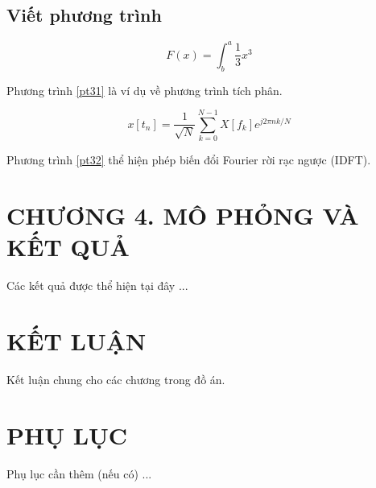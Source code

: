 \documentclass{thesis}
\begin{document}
\subsection{Viết phương trình}
    \begin{equation}\label{pt31}
        F(x) = \int^a_b \frac{1}{3}x^3
    \end{equation}
    
Phương trình \ref{pt31} là ví dụ về phương trình tích phân.

    \begin{equation}\label{pt32}
         x[t_n] = \frac{1}{\sqrt{N}} \sum_{k=0}^{N-1}X[f_k]e^{j 2\pi n k/N}
    \end{equation}
    
Phương trình \ref{pt32} thể hiện phép biến đổi Fourier rời rạc ngược (IDFT).

\newpage
\section*{CHƯƠNG 4. MÔ PHỎNG VÀ KẾT QUẢ}
\setcounter{section}{4}
    \setcounter{figure}{0}
        \setcounter{table}{0}
            \setcounter{equation}{0}


Các kết quả được thể hiện tại đây ...


\newpage

\section*{KẾT LUẬN}
    
Kết luận chung cho các chương trong đồ án.


\newpage



\newpage

\section*{PHỤ LỤC}

Phụ lục cần thêm (nếu có)
...
\end{document}
